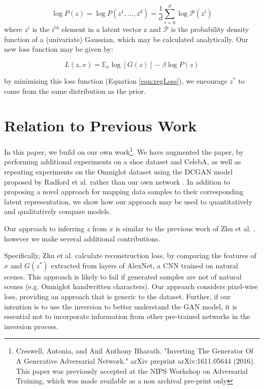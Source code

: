 \documentclass[journal]{IEEEtran}
\begin{document}
\[ \log P(z) = \log P(z^1, ..., z^d) = \frac{1}{d}\sum_{i=0}^d \log \mathcal{P}(z^i) \] 
where $z^i$ is the $i^{th}$ element in a latent vector z and $\mathcal{P}$ is the probability density function of a (univariate) Gaussian, which may be calculated analytically. Our new loss function may be given by:




\begin{equation} \label{eqn:regLoss}
     L(z,x) = {\mathbb E}_x \log[G(z)] - \beta \log P(z)
\end{equation}

by minimising this loss function (Equation \ref{eqn:regLoss}), we encourage $z^*$ to come from the same distribution as the prior.




\section{Relation to Previous Work}

In this paper, we build on our own work\footnote{Creswell, Antonia, and Anil Anthony Bharath. "Inverting The Generator Of A Generative Adversarial Network." arXiv preprint arXiv:1611.05644 (2016). This paper was previously accepted at the NIPS Workshop on Adversarial Training, which was made available as a non archival pre-print only}. We have augmented the paper, by performing additional experiments on a shoe dataset \cite{luo2017learning} and CelebA, as well as repeating experiments on the Omniglot dataset using the DCGAN model proposed by Radford et al. \cite{radford2015unsupervised} rather than our own network \cite{creswell2016task}. In addition to proposing a novel approach for mapping data samples to their corresponding latent representation, we show how our approach may be used to quantitatively and qualitatively compare models.


Our approach to inferring $z$ from $x$ is similar to the previous work of Zhu et al. \cite{zhu2016generative}, however we make several additional contributions. 






Specifically, Zhu et al. \cite{zhu2016generative} calculate reconstruction loss, by comparing the features of $x$ and $G(z^*)$ extracted from layers of AlexNet, a CNN trained on natural scenes. This approach is likely to fail if generated samples are not of natural scenes (e.g. Omniglot handwritten characters). Our approach considers pixel-wise loss, providing an approach that is generic to the dataset. Further, if our intention is to use the inversion to better understand the GAN model, it is essential not to incorporate information from other pre-trained networks in the inversion process.
\end{document}
